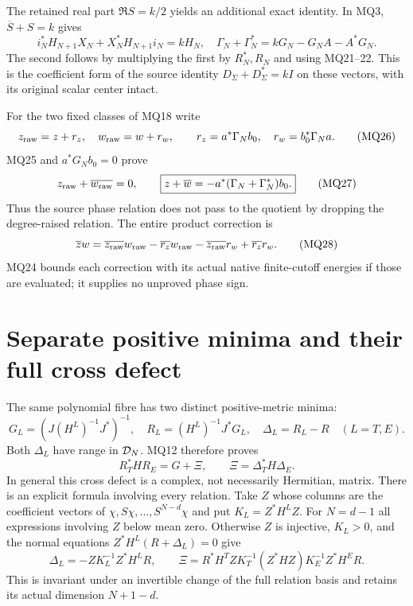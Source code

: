 The retained real part $\Re S=k/2$ yields an additional exact
identity. In MQ3, $\overline S+S=k$ gives
\[
 i_N^*H_{N+1}X_N+X_N^*H_{N+1}i_N=kH_N,
 \quad
 \boxed{\Gamma_N+\Gamma_N^*=kG_N-G_NA-A^*G_N.}              \tag{MQ25}
\]
The second follows by multiplying the first by $R_N^*,R_N$ and
using MQ21--22. This is the coefficient form of the source identity
$D_\Sigma+D_\Sigma^*=kI$ on these vectors, with its original
scalar center intact.

For the two fixed classes of MQ18 write
\[
 z_{\rm raw}=z+r_z,\quad w_{\rm raw}=w+r_w,\qquad
 r_z=a^*\Gamma_Nb_0,\quad r_w=b_0^*\Gamma_Na.                \tag{MQ26}
\]
MQ25 and $a^*G_Nb_0=0$ prove
\[
 z_{\rm raw}+\overline{w_{\rm raw}}=0,\qquad
 \boxed{z+\overline w=-a^*(\Gamma_N+\Gamma_N^*)b_0.}         \tag{MQ27}
\]
Thus the source phase relation does not pass to the quotient by
dropping the degree-raised relation. The entire product correction is
\[
 \overline zw=\overline{z_{\rm raw}}w_{\rm raw}
     -\overline{r_z}w_{\rm raw}
     -\overline{z_{\rm raw}}r_w+\overline{r_z}r_w.            \tag{MQ28}
\]
MQ24 bounds each correction with its actual native finite-cutoff
energies if those are evaluated; it supplies no unproved phase sign.

\section{Separate positive minima and their full cross defect}
The same polynomial fibre has two distinct positive-metric minima:
\[
 G_L=(J(H^L)^{-1}J^*)^{-1},\quad
 R_L=(H^L)^{-1}J^*G_L,\quad \Delta_L=R_L-R\quad(L=T,E).
                                                               \tag{MQ29}
\]
Both $\Delta_L$ have range in $\mathcal D_N$. MQ12 therefore proves
\[
 R_T^*HR_E=G+\Xi,\qquad
 \boxed{\Xi=\Delta_T^*H\Delta_E.}                           \tag{MQ30}
\]
In general this cross defect is a complex, not necessarily Hermitian,
matrix. There is an explicit formula involving every relation.
Take $Z$ whose columns are the coefficient vectors of
$\chi,S\chi,\ldots,S^{N-d}\chi$ and put $K_L=Z^*H^LZ$.
For $N=d-1$ all expressions involving $Z$ below mean zero.
Otherwise $Z$ is injective, $K_L>0$, and the normal equations
$Z^*H^L(R+\Delta_L)=0$ give
\[
 \Delta_L=-ZK_L^{-1}Z^*H^LR,\qquad
 \Xi=R^*H^TZK_T^{-1}(Z^*HZ)K_E^{-1}Z^*H^ER.                \tag{MQ31}
\]
This is invariant under an invertible change of the full relation
basis and retains its actual dimension $N+1-d$.

